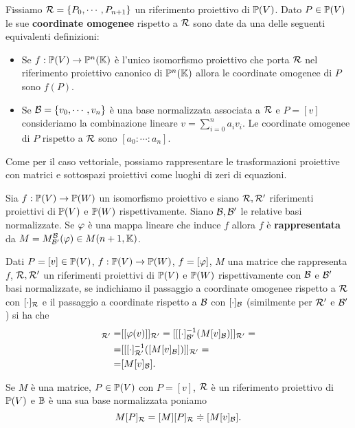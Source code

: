 \begin{multicols*}{2}
    \begin{definition}
        Fissiamo $\mathcal{R}=\{P_0,\cdots,P_{n+1}\}$ un riferimento proiettivo di ${\mathbb{P}(V)}$. Dato $P\in{\mathbb{P}(V)}$ le sue \textbf{coordinate omogenee} rispetto a $\mathcal{R}$ sono date da una delle seguenti equivalenti definizioni:
        \begin{itemize}[noitemsep]
            \item Se $f:{\mathbb{P}(V)}\to\mathbb{P}^n(\mathbb{K})$ \`e l'unico isomorfismo proiettivo che porta $\mathcal{R}$ nel riferimento proiettivo canonico di $\mathbb{P}^n(\mathbb{K})$ allora le coordinate omogenee di $P$ sono $f(P)$.
            \item Se $\mathcal{B}=\{v_0,\cdots,v_n\}$ \`e una base normalizzata associata a $\mathcal{R}$ e $P=[v]$ consideriamo la combinazione lineare $v=\sum_{i=0}^na_iv_i$. Le coordinate omogenee di $P$ rispetto a $\mathcal{R}$ sono $[a_0:\cdots:a_n]$.
        \end{itemize}
    \end{definition}

    Come per il caso vettoriale, possiamo rappresentare le trasformazioni proiettive con matrici e sottospazi proiettivi come luoghi di zeri di equazioni.
    \begin{definition}
    Sia $f:{\mathbb{P}(V)}\to{\mathbb{P}(W)}$ un isomorfismo proiettivo e siano $\mathcal{R},\mathcal{R}'$ riferimenti proiettivi di ${\mathbb{P}(V)}$ e ${\mathbb{P}(W)}$ rispettivamente. Siano $\mathcal{B},\mathcal{B}'$ le relative basi normalizzate. Se $\varphi$ \`e una mappa lineare che induce $f$ allora $f$ \`e \textbf{rappresentata} da $M=M^{\mathcal{B}}_{\mathcal{B}'}(\varphi)\in M(n+1,\mathbb{K})$.
    \end{definition}
    \begin{remark}
    Dati $P=[v]\in {\mathbb{P}(V)}$, $f:{\mathbb{P}(V)}\to{\mathbb{P}(W)}$, $f=[\varphi]$, $M$ una matrice che rappresenta $f$, $\mathcal{R},\mathcal{R}'$ un riferimenti proiettivi di ${\mathbb{P}(V)}$ e ${\mathbb{P}(W)}$ rispettivamente con $\mathcal{B}$ e $\mathcal{B}'$ basi normalizzate, se indichiamo il passaggio a coordinate omogenee rispetto a $\mathcal{R}$ con $[\cdot]_{\mathcal{R}}$ e il passaggio a coordinate rispetto a $\mathcal{B}$ con $[\cdot]_{\mathcal{B}}$ (similmente per $\mathcal{R}'$ e $\mathcal{B}'$) si ha che
    \begin{align*}
    [f(P)]_{\Rc'}=&[[\vp(v)]]_{\Rc'}=[[[\cdot]_{\Bc'}\ii(M[v]_{\Bc})]]_{\Rc'}=\\
    =&[[[\cdot]_{\Rc'}\ii([M[v]_{\Bc}])]]_{\Rc'}=\\
    =& [M[v]_{\Bc}].
    \end{align*}
    \end{remark}
    \begin{notation}
    Se $M$ \`e una matrice, $P\in {\mathbb{P}(V)}$ con $P=[v]$, $\mathcal{R}$ \`e un riferimento proiettivo di ${\mathbb{P}(V)}$ e $\mathbb{B}$ \`e una sua base normalizzata poniamo
    \[M[P]_{\mathcal{R}}= [M][P]_{\mathcal{R}}\doteqdot [M[v]_{\mathcal{B}}].\]
    \end{notation}


\end{multicols*}
